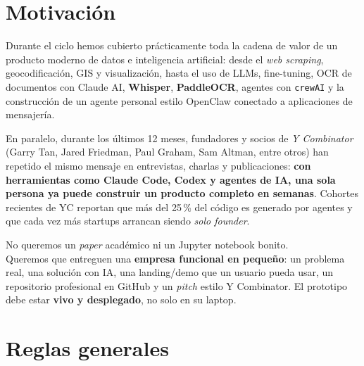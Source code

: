 \documentclass[11pt,a4paper]{article}
\begin{document}
\section{Motivaci\'on}

Durante el ciclo hemos cubierto pr\'acticamente toda la cadena de valor de un producto moderno
de datos e inteligencia artificial: desde el \emph{web scraping}, geocodificaci\'on, GIS y
visualizaci\'on, hasta el uso de LLMs, fine-tuning, OCR de documentos con Claude AI,
\textbf{Whisper}, \textbf{PaddleOCR}, agentes con \texttt{crewAI} y la construcci\'on de un
agente personal estilo OpenClaw conectado a aplicaciones de mensajer\'ia.

En paralelo, durante los \'ultimos 12 meses, fundadores y socios de \emph{Y Combinator}
(Garry Tan, Jared Friedman, Paul Graham, Sam Altman, entre otros) han repetido el mismo
mensaje en entrevistas, charlas y publicaciones: \textbf{con herramientas como Claude Code,
Codex y agentes de IA, una sola persona ya puede construir un producto completo en semanas}.
Cohortes recientes de YC reportan que m\'as del 25\,\% del c\'odigo es generado por agentes
y que cada vez m\'as startups arrancan siendo \emph{solo founder}.

\begin{tcolorbox}[ycbox={Qu\'e les pedimos}]
No queremos un \emph{paper} acad\'emico ni un Jupyter notebook bonito.\\[2pt]
Queremos que entreguen una \textbf{empresa funcional en peque\~no}: un problema real,
una soluci\'on con IA, una landing/demo que un usuario pueda usar, un repositorio
profesional en GitHub y un \emph{pitch} estilo Y Combinator. El prototipo debe estar
\textbf{vivo y desplegado}, no solo en su laptop.
\end{tcolorbox}

\section{Reglas generales}
\end{document}
